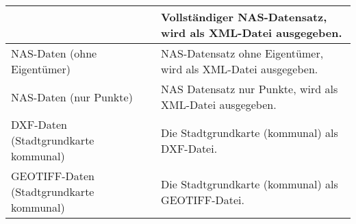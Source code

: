 \begin{longtable}{|p{}|p{}|}
&
Vollständiger \acs{NAS}-Datensatz, wird als \acs{XML}-Datei ausgegeben. \\
\hline
\acs{NAS}-Daten (ohne Eigentümer)
&
\acs{NAS}-Datensatz ohne Eigentümer, wird als \acs{XML}-Datei ausgegeben. \\
\hline
\acs{NAS}-Daten (nur Punkte)
&
\acs{NAS} Datensatz nur Punkte, wird als \acs{XML}-Datei ausgegeben. \\
\hline
\acs{DXF}-Daten (Stadtgrundkarte kommunal)
&
Die Stadtgrundkarte (kommunal) als \acs{DXF}-Datei.  \\
\hline
GEOTIFF-Daten (Stadtgrundkarte kommunal)
&
Die Stadtgrundkarte (kommunal) als GEOTIFF-Datei. \\
\hline

\end{longtable} 